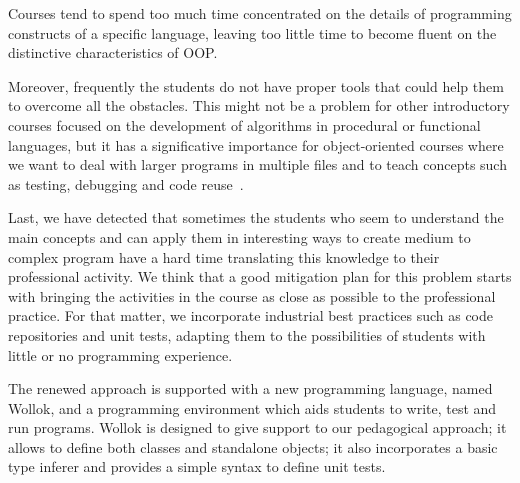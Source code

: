 
Courses tend to spend too much time concentrated on the details of programming constructs of a specific language, leaving too little time to become fluent on the distinctive characteristics of OOP. 

Moreover, frequently the students do not have proper tools that could help them to overcome all the obstacles.
This might not be a problem for other introductory courses focused on the development of algorithms in procedural or functional languages, 
but it has a significative importance for object-oriented courses where we want to deal with larger programs in multiple files and to teach concepts such as testing, debugging and code reuse~\cite{kolling_problem_1999}. 

\medskip




Last, we have detected that sometimes the students who seem to understand the main concepts and can apply them in interesting ways to create medium to complex program have a hard time translating this knowledge to their professional activity.
We think that a good mitigation plan for this problem starts with bringing the activities in the course as close as possible to the professional practice.
For that matter, we incorporate industrial best practices such as code repositories and unit tests, adapting them to the possibilities of students with little or no programming experience.

\medskip
The renewed approach is supported with a new programming language, named Wollok, and a programming environment which aids students to write, test and run programs.
Wollok is designed to give support to our pedagogical approach; 
it allows to define both classes and standalone objects;
it also incorporates a basic type inferer
and provides a simple syntax to define unit tests.

